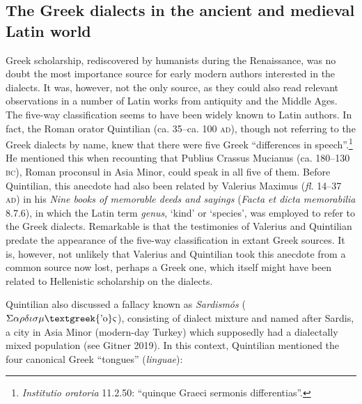 \subsection{The Greek dialects in the ancient and medieval Latin world}
\hypertarget{Toc19704811}{}\begin{styleStandard}
Greek scholarship, rediscovered by humanists during the Renaissance, was no doubt the most importance source for early modern authors interested in the dialects. It was, however, not the only source, as they could also read relevant observations in a number of Latin works from antiquity and the Middle Ages. The five-way classification seems to have been widely known to Latin authors. In fact, the Roman orator Quintilian (ca. 35–ca. 100 \textsc{ad}), though not referring to the Greek dialects by name, knew that there were five Greek “differences in speech”.\footnote{\textrm{ }\textrm{\textit{Institutio oratoria}}\textrm{ 11.2.50: “quinque Graeci sermonis differentias”.}} He mentioned this when recounting that Publius Crassus Mucianus (ca. 180–130 \textsc{bc}), Roman proconsul in Asia Minor, could speak in all five of them. Before Quintilian, this anecdote had also been related by Valerius Maximus (\textit{fl.} 14–37 \textsc{ad}) in his \textit{Nine books of memorable deeds and sayings} (\textit{Facta et dicta memorabilia} 8.7.6), in which the Latin term \textit{genus}, ‘kind’ or ‘species’, was employed to refer to the Greek dialects. Remarkable is that the testimonies of Valerius and Quintilian predate the appearance of the five-way classification in extant Greek sources. It is, however, not unlikely that Valerius and Quintilian took this anecdote from a common source now lost, perhaps a Greek one, which itself might have been related to Hellenistic scholarship on the dialects.
\end{styleStandard}

\begin{styleStandard}
Quintilian also discussed a fallacy known as \textit{Sardismós }($\Sigma \alpha \rho \delta \iota \sigma \mu \text{\textgreek{'o}}\varsigma $), consisting of dialect mixture and named after Sardis, a city in Asia Minor (modern-day Turkey) which supposedly had a dialectally mixed population (see Gitner 2019). In this context, Quintilian mentioned the four canonical Greek “tongues” (\textit{linguae}):
\end{styleStandard}

